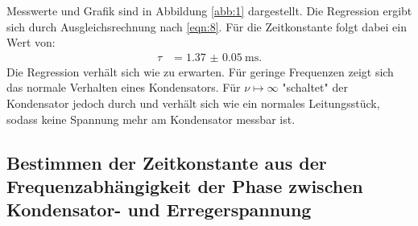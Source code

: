 Messwerte und Grafik sind in Abbildung \ref{abb:1} dargestellt. Die Regression ergibt sich
durch Ausgleichsrechnung nach \eqref{eqn:8}. Für die Zeitkonstante folgt dabei ein Wert von:
\begin{align*}
  \tau &= \SI{1.37(5)}{\milli\second}.
\end{align*}
Die Regression verhält sich wie zu erwarten. Für geringe Frequenzen zeigt sich das normale
Verhalten eines Kondensators. Für $\nu \mapsto \infty$ "schaltet" der Kondensator jedoch durch
und verhält sich wie ein normales Leitungsstück, sodass keine Spannung mehr am Kondensator messbar ist.
\subsection{Bestimmen der Zeitkonstante aus der Frequenzabhängigkeit der Phase zwischen Kondensator-
und Erregerspannung}
